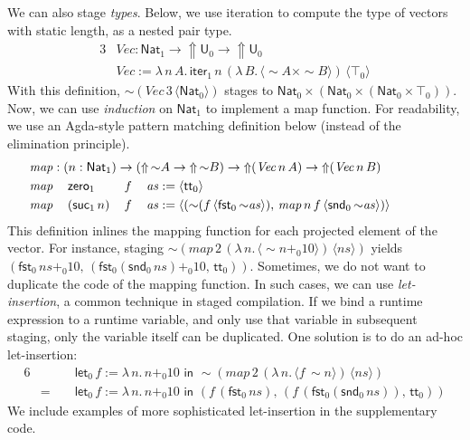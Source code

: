 \documentclass[acmsmall,review]{acmart}
\newcommand{\mit}[1]{\mathit{#1}}
\newcommand{\msf}[1]{\mathsf{#1}}
\newcommand{\Lift}{{\Uparrow}}
\newcommand{\spl}{{\sim}}
\newcommand{\qut}[1]{\langle #1\rangle}
\renewcommand{\U}{\msf{U}}
\newcommand{\Nat}{\msf{Nat}}
\newcommand{\zero}{\msf{zero}}
\newcommand{\suc}{\msf{suc}}
\renewcommand{\tt}{\msf{tt}}
\newcommand{\fst}{\msf{fst}}
\newcommand{\snd}{\msf{snd}}
\newcommand{\mylet}{\msf{let}}
\theoremstyle{remark}
\begin{document}
We can also stage \emph{types}. Below, we use iteration to compute the type of
vectors with static length, as a nested pair type.
\begin{alignat*}{3}
  &\mit{Vec} : \Nat_1 \to \Lift \U_0 \to \Lift \U_0\\
  &\mit{Vec} := \lambda\,n\,A.\,\msf{iter}_1\,n\,(\lambda\,B.\,\qut{\spl A \times \spl B})\,\qut{\top_0}
\end{alignat*}
With this definition, $\spl(\mit{Vec}\,3\,\qut{\Nat_0})$ stages to $\Nat_0
\times (\Nat_0 \times (\Nat_0 \times \top_0))$. Now, we can use \emph{induction}
on $\Nat_1$ to implement a map function. For readability, we use an Agda-style
pattern matching definition below (instead of the elimination principle).
\begin{alignat*}{6}
  &\hspace{-3em}\rlap{$\mit{map} : (n : \Nat_1) \to (\Lift\,\spl A \to \Lift\,\spl B) \to \Lift(\mit{Vec}\,n\,A) \to \Lift(\mit{Vec}\,n\,B)$}\\
  &\hspace{-3em}\mit{map}\,&&\zero_1      && f\,&&\mit{as} := \qut{\tt_0}\\
  &\hspace{-3em}\mit{map}\,&&(\suc_1\,n)\,&& f\,&&\mit{as} :=
     \qut{(\spl(f\,\qut{\fst_0\,\spl\mit{as}}),\,\mit{map}\,n\,f\,\qut{\snd_0\,\spl \mit{as}})}
\end{alignat*}
This definition inlines the mapping function for each projected element of the
vector. For instance, staging $\spl(\mit{map}\,2\,(\lambda\,n.\,\qut{\spl n +_0
  10})\,\qut{\mit{ns}})$ yields $(\fst_0\,\mit{ns} +_0
10,\,(\fst_0(\snd_0\,\mit{ns}) +_0 10,\,\tt_0))$. Sometimes, we do not want to
duplicate the code of the mapping function. In such cases, we can use
\emph{let-insertion}, a common technique in staged compilation. If we bind a runtime
expression to a runtime variable, and only use that variable in subsequent
staging, only the variable itself can be duplicated. One solution is to do an
ad-hoc let-insertion:
\begin{alignat*}{6}
  &   && \mylet_0\,f := \lambda\,n.\, n +_0 10\,\,\msf{in}\,\,
         \spl(\mit{map}\,2\,(\lambda\,n.\,\qut{f\,\spl n})\,\qut{\mit{ns}}) \\
  & =\,\,&&  \mylet_0\,f := \lambda\,n.\, n +_0 10\,\,\msf{in}\,\,
          (f\,(\fst_0\,\mit{ns}),\,(f\,(\fst_0(\snd_0\,\mit{ns})),\,\tt_0))
\end{alignat*}
We include examples of more sophisticated let-insertion in the supplementary
code.
\end{document}
